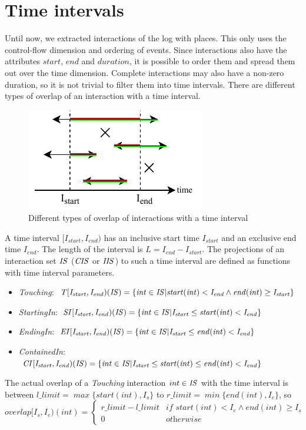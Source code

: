 \section{Time intervals} \label{timeintervals}
Until now, we extracted interactions of the log with places. This only uses the control-flow dimension and ordering of events. Since interactions also have the attributes $start$, $end$ and $duration$, it is possible to order them and spread them out over the time dimension. Complete interactions may also have a non-zero duration, so it is not trivial to filter them into time intervals. There are different types of overlap of an interaction with a time interval.
\begin{figure}
    \centering
    \includegraphics[scale=2]{figures/concept/timeinterval_overlap.pdf}
    \caption{Different types of overlap of interactions with a time interval}
    \label{fig:interactionoverlap}
\end{figure}
\begin{definition}
A time interval $[I_{start}, I_{end})$ has an inclusive start time $I_{start}$ and an exclusive end time $I_{end}$. The length of the interval is $L = I_{end} - I_{start}$.
The projections of an interaction set $\mathit{IS}$ ($\mathit{CIS}$ or $\mathit{IIS}$) to such a time interval are defined as functions with time interval parameters.
\begin{itemize}
    \item\emph{Touching}: $\mathit{T[I_{start}, I_{end})( IS ) = \{int\in IS|start(int) < I_{end} \wedge end(int)\ge I_{start}\}}$
    \item\emph{StartingIn}: $\mathit{SI[I_{start}, I_{end})( IS ) = \{int\in IS|I_{start}\le start(int) < I_{end}\}}$
    \item\emph{EndingIn}: $\mathit{EI[I_{start}, I_{end})( IS ) = \{int\in IS|I_{start}\le end(int) < I_{end}\}}$
    \item\emph{ContainedIn}: $\mathit{CI[I_{start}, I_{end})( IS ) = \{int\in IS|I_{start}\le start(int) \le end(int) < I_{end}\}}$
\end{itemize}
The actual overlap of a \emph{Touching} interaction $int \in \mathit{IS}$ with the time interval is between $\mathit{l\_limit = \max\{start(int), I_s\}}$ to $\mathit{r\_limit =  \min\{end(int), I_e\}}$, so $$\mathit{overlap[I_s,I_e)( int ) = \begin{cases} r\_limit - l\_limit & \text{if } start(int) < I_e \wedge end(int) \ge I_s  \\
0 & \text{otherwise}\end{cases}}$$
\end{definition}

